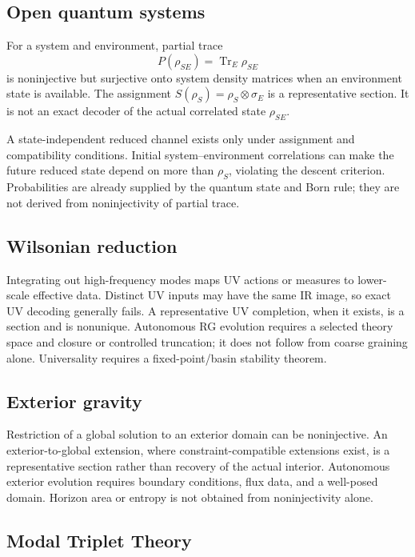 \documentclass[11pt]{article}
\begin{document}
\subsection{Open quantum systems}

For a system and environment, partial trace
\[
 P(\rho_{SE})=\operatorname{Tr}_E\rho_{SE}
\]
is noninjective but surjective onto system density matrices when an environment
state is available. The assignment
$S(\rho_S)=\rho_S\otimes\sigma_E$ is a representative section. It is not an
exact decoder of the actual correlated state $\rho_{SE}$.

A state-independent reduced channel exists only under assignment and
compatibility conditions. Initial system--environment correlations can make
the future reduced state depend on more than $\rho_S$, violating the descent
criterion. Probabilities are already supplied by the quantum state and Born
rule; they are not derived from noninjectivity of partial trace.

\subsection{Wilsonian reduction}

Integrating out high-frequency modes maps UV actions or measures to lower-scale
effective data. Distinct UV inputs may have the same IR image, so exact UV
decoding generally fails. A representative UV completion, when it exists,
is a section and is nonunique. Autonomous RG evolution requires a selected
theory space and closure or controlled truncation; it does not follow from
coarse graining alone. Universality requires a fixed-point/basin stability
theorem.

\subsection{Exterior gravity}

Restriction of a global solution to an exterior domain can be noninjective.
An exterior-to-global extension, where constraint-compatible extensions exist,
is a representative section rather than recovery of the actual interior.
Autonomous exterior evolution requires boundary conditions, flux data, and a
well-posed domain. Horizon area or entropy is not obtained from
noninjectivity alone.

\subsection{Modal Triplet Theory}
\end{document}
